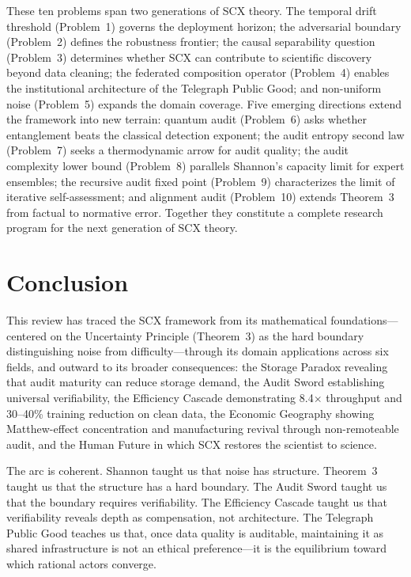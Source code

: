 \documentclass[twocolumn]{article}
\theoremstyle{definition}
\begin{document}
These ten problems span two generations of SCX theory. The temporal drift threshold (Problem~1) governs the deployment horizon; the adversarial boundary (Problem~2) defines the robustness frontier; the causal separability question (Problem~3) determines whether SCX can contribute to scientific discovery beyond data cleaning; the federated composition operator (Problem~4) enables the institutional architecture of the Telegraph Public Good; and non-uniform noise (Problem~5) expands the domain coverage. Five emerging directions extend the framework into new terrain: quantum audit (Problem~6) asks whether entanglement beats the classical detection exponent; the audit entropy second law (Problem~7) seeks a thermodynamic arrow for audit quality; the audit complexity lower bound (Problem~8) parallels Shannon's capacity limit for expert ensembles; the recursive audit fixed point (Problem~9) characterizes the limit of iterative self-assessment; and alignment audit (Problem~10) extends Theorem~3 from factual to normative error. Together they constitute a complete research program for the next generation of SCX theory.

\section{Conclusion}

This review has traced the SCX framework from its mathematical foundations---centered on the Uncertainty Principle (Theorem~3) as the hard boundary distinguishing noise from difficulty---through its domain applications across six fields, and outward to its broader consequences: the Storage Paradox revealing that audit maturity can reduce storage demand, the Audit Sword establishing universal verifiability, the Efficiency Cascade demonstrating 8.4$\times$ throughput and 30--40\% training reduction on clean data, the Economic Geography showing Matthew-effect concentration and manufacturing revival through non-remoteable audit, and the Human Future in which SCX restores the scientist to science.

The arc is coherent. Shannon taught us that noise has structure. Theorem~3 taught us that the structure has a hard boundary. The Audit Sword taught us that the boundary requires verifiability. The Efficiency Cascade taught us that verifiability reveals depth as compensation, not architecture. The Telegraph Public Good teaches us that, once data quality is auditable, maintaining it as shared infrastructure is not an ethical preference---it is the equilibrium toward which rational actors converge.
\end{document}
